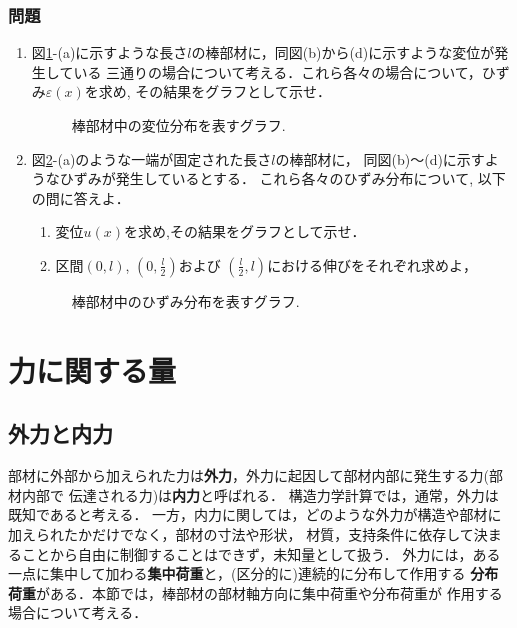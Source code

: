 \documentclass[11pt,a4j]{mybook2}
\begin{document}
\subsection{問題}
\begin{enumerate}
\item
図\ref{fig:fig1}-(a)に示すような長さ$l$の棒部材に，同図(b)から(d)に示すような変位が発生している
三通りの場合について考える．これら各々の場合について，ひずみ$\varepsilon(x)$を求め, 
その結果をグラフとして示せ．
\begin{figure}[h]
	\begin{center}

	\end{center}
	\caption{棒部材中の変位分布を表すグラフ.} 
	\label{fig:fig1}
\end{figure}
\item
図\ref{fig:fig2}-(a)のような一端が固定された長さ$l$の棒部材に，
同図(b)〜(d)に示すようなひずみが発生しているとする．
これら各々のひずみ分布について, 以下の問に答えよ．
	\begin{enumerate}
	\renewcommand{\theenumii}{\roman{enumii}}
	\item
		変位$u(x)$を求め,その結果をグラフとして示せ．
	\item
	区間$(0,l)$, $\left(0,\frac{l}{2}\right)$および
	$\left(\frac{l}{2},l\right)$における伸びをそれぞれ求めよ，
	\end{enumerate}
\begin{figure}[h]
	\begin{center}
	\end{center}
	\caption{棒部材中のひずみ分布を表すグラフ.} 
	\label{fig:fig2}
\end{figure}
\end{enumerate}
\newpage
\chapter{力に関する量}
\section{外力と内力}
部材に外部から加えられた力は{\rm \bf 外力}，外力に起因して部材内部に発生する力(部材内部で
伝達される力)は{\rm \bf 内力}と呼ばれる．
構造力学計算では，通常，外力は既知であると考える．
一方，内力に関しては，どのような外力が構造や部材に加えられたかだけでなく，部材の寸法や形状，
材質，支持条件に依存して決まることから自由に制御することはできず，未知量として扱う．
外力には，ある一点に集中して加わる{\rm \bf 集中荷重}と，(区分的に)連続的に分布して作用する
{\rm \bf 分布荷重}がある．本節では，棒部材の部材軸方向に集中荷重や分布荷重が
作用する場合について考える．
\end{document}

